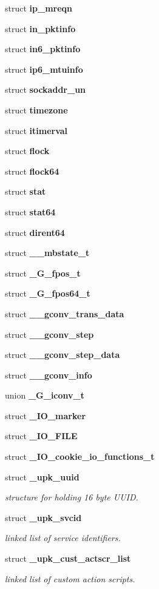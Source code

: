 \begin{DoxyCompactItemize}
struct {\bf ip\_\-mreqn}
\item 
struct {\bf in\_\-pktinfo}
\item 
struct {\bf in6\_\-pktinfo}
\item 
struct {\bf ip6\_\-mtuinfo}
\item 
struct {\bf sockaddr\_\-un}
\item 
struct {\bf timezone}
\item 
struct {\bf itimerval}
\item 
struct {\bf flock}
\item 
struct {\bf flock64}
\item 
struct {\bf stat}
\item 
struct {\bf stat64}
\item 
struct {\bf dirent64}
\item 
struct {\bf \_\-\_\-mbstate\_\-t}
\item 
struct {\bf \_\-G\_\-fpos\_\-t}
\item 
struct {\bf \_\-G\_\-fpos64\_\-t}
\item 
struct {\bf \_\-\_\-gconv\_\-trans\_\-data}
\item 
struct {\bf \_\-\_\-gconv\_\-step}
\item 
struct {\bf \_\-\_\-gconv\_\-step\_\-data}
\item 
struct {\bf \_\-\_\-gconv\_\-info}
\item 
union {\bf \_\-G\_\-iconv\_\-t}
\item 
struct {\bf \_\-IO\_\-marker}
\item 
struct {\bf \_\-IO\_\-FILE}
\item 
struct {\bf \_\-IO\_\-cookie\_\-io\_\-functions\_\-t}
\item 
struct {\bf \_\-upk\_\-uuid}
\begin{DoxyCompactList}\small\item\em structure for holding 16 byte UUID. \end{DoxyCompactList}\item 
struct {\bf \_\-upk\_\-svcid}
\begin{DoxyCompactList}\small\item\em linked list of service identifiers. \end{DoxyCompactList}\item 
struct {\bf \_\-upk\_\-cust\_\-actscr\_\-list}
\begin{DoxyCompactList}\small\item\em linked list of custom action scripts. \end{DoxyCompactList}\item 

\end{DoxyCompactItemize}
